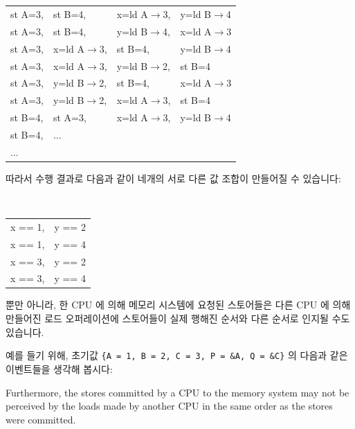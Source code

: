 ~ \\
\begin{minipage}[t]{\columnwidth}
\tt
\scriptsize
\begin{tabular}{llll}
	st A=3, & st B=4, & x=ld A$\rightarrow$3, & y=ld B$\rightarrow$4 \\
	st A=3, & st B=4, & y=ld B$\rightarrow$4, & x=ld A$\rightarrow$3 \\
	st A=3, & x=ld A$\rightarrow$3, & st B=4, & y=ld B$\rightarrow$4 \\
	st A=3, & x=ld A$\rightarrow$3, & y=ld B$\rightarrow$2, & st B=4 \\
	st A=3, & y=ld B$\rightarrow$2, & st B=4, & x=ld A$\rightarrow$3 \\
	st A=3, & y=ld B$\rightarrow$2, & x=ld A$\rightarrow$3, & st B=4 \\
	st B=4, & st A=3, & x=ld A$\rightarrow$3, & y=ld B$\rightarrow$4 \\
	st B=4, & ... & & \\
	... & & & \\
\end{tabular}
\end{minipage}
\vspace{5pt}

따라서 수행 결과로 다음과 같이 네개의 서로 다른 값 조합이 만들어질 수 있습니다:

\vspace{5pt}
\begin{minipage}[t]{\columnwidth}
\tt
\scriptsize
\begin{tabular}{ll}
	x == 1, & y == 2 \\
	x == 1, & y == 4 \\
	x == 3, & y == 2 \\
	x == 3, & y == 4 \\
\end{tabular}
\end{minipage}
\vspace{5pt}

뿐만 아니라, 한 CPU 에 의해 메모리 시스템에 요청된 스토어들은 다른 CPU 에 의해
만들어진 로드 오퍼레이션에 스토어들이 실제 행해진 순서와 다른 순서로 인지될
수도 있습니다.

예를 들기 위해, 초기값 {\tt \{A = 1, B = 2, C = 3, P = \&A, Q = \&C\}} 의
다음과 같은 이벤트들을 생각해 봅시다:
\iffalse

Furthermore, the stores committed by a CPU to the memory system may not be
perceived by the loads made by another CPU in the same order as the stores were
committed.

